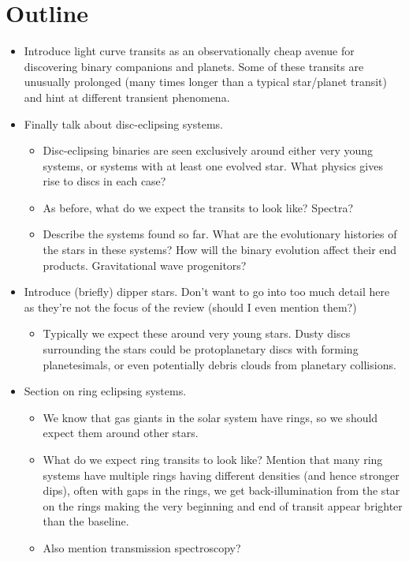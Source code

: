 \documentclass[%
 reprint,
 amsmath,amssymb,
 aps,
rmp,
floatfix,
]{revtex4-2}
\begin{document}
\section{Outline}
\begin{itemize}
    \item Introduce light curve transits as an observationally cheap avenue for discovering binary companions and planets. Some of these transits are unusually prolonged (many times longer than a typical star/planet transit) and hint at different transient phenomena. 
    \item Finally talk about disc-eclipsing systems. 
    \begin{itemize}
        \item Disc-eclipsing binaries are seen exclusively around either very young systems, or systems with at least one evolved star. What physics gives rise to discs in each case?
        \item As before, what do we expect the transits to look like? Spectra?
        \item Describe the systems found so far. What are the evolutionary histories of the stars in these systems? How will the binary evolution affect their end products. Gravitational wave progenitors?
    \end{itemize}
    \item Introduce (briefly) dipper stars. Don't want to go into too much detail here as they're not the focus of the review (should I even mention them?)    
    \begin{itemize}
        \item Typically we expect these around very young stars. Dusty discs surrounding the stars could be protoplanetary discs with forming planetesimals, or even potentially debris clouds from planetary collisions. 
    \end{itemize}
    \item Section on ring eclipsing systems. 
    \begin{itemize}
        \item We know that gas giants in the solar system have rings, so we should expect them around other stars. 
        \item What do we expect ring transits to look like? Mention that many ring systems have multiple rings having different densities (and hence stronger dips), often with gaps in the rings, we get back-illumination from the star on the rings making the very beginning and end of transit appear brighter than the baseline. \item Also mention transmission spectroscopy?

\end{itemize}
\end{itemize}
\end{document}
